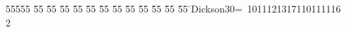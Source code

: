 %
%
\begin{tabbing}
55555 \= 55 \= 55 \= 55 \= 55 \= 55 \= 55 \= 55 \= 55 \= 55 \= 55 \= 55 \= 55 \= \>Dickson30=\ 1011121317110111116\\[0pt]
2\>\end{tabbing}
